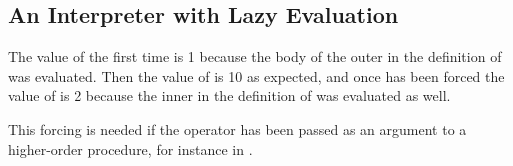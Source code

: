 \subsection{An Interpreter with Lazy Evaluation}

\begin{exe}[4.27]
    The value of  the first time is 1 because the body of the outer 
     in the definition of  was evaluated. Then the value of 
     is 10 as expected, and once  has been forced the value of 
     is 2 because the inner  in the definition of  
    was evaluated as well.
\end{exe}

\begin{exe}[4.28]
    This forcing is needed if the operator has been passed as an argument to 
    a higher-order procedure, for instance in .
\end{exe}

